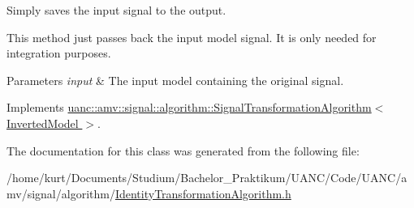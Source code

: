 Simply saves the input signal to the output. 

This method just passes back the input model signal. It is only needed for integration purposes.


\begin{DoxyParams}{Parameters}
{\em input} & The input model containing the original signal. \\
\hline
\end{DoxyParams}


Implements \hyperlink{classuanc_1_1amv_1_1signal_1_1algorithm_1_1_signal_transformation_algorithm_a40dee2d59e84244373cacc9c472514d6}{uanc\+::amv\+::signal\+::algorithm\+::\+Signal\+Transformation\+Algorithm$<$ Inverted\+Model $>$}.



The documentation for this class was generated from the following file\+:\begin{DoxyCompactItemize}
\item 
/home/kurt/\+Documents/\+Studium/\+Bachelor\+\_\+\+Praktikum/\+U\+A\+N\+C/\+Code/\+U\+A\+N\+C/amv/signal/algorithm/\hyperlink{_identity_transformation_algorithm_8h}{Identity\+Transformation\+Algorithm.\+h}\end{DoxyCompactItemize}
